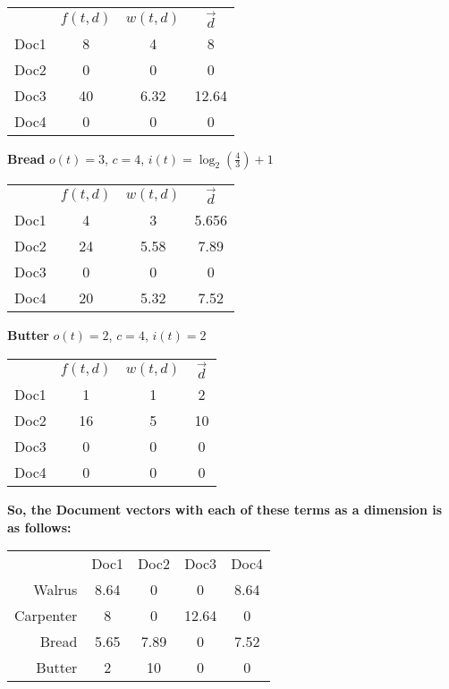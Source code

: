 \documentclass{article}
\begin{document}
\begin{tabular}{r c c c}
\multicolumn{1}{r}{}
 & \multicolumn{1}{c}{$f(t,d)$}
 & \multicolumn{1}{c}{$w(t,d)$}
 & \multicolumn{1}{c}{$\vec{d}$} \\
\cline{2-4}
Doc1 & 8 & 4 & 8 \\
\cline{2-4}
Doc2 & 0 & 0 & 0 \\
\cline{2-4}
Doc3 & 40 & 6.32 & 12.64 \\
\cline{2-4}
Doc4 & 0 & 0 & 0 \\
\cline{2-4}
\end{tabular}

\vspace{5mm}
\textbf{Bread}
$o(t) = 3$, $c = 4$, $i(t) = \log_2(\frac{4}{3}) + 1$

\begin{tabular}{r c c c}
\multicolumn{1}{r}{}
 & \multicolumn{1}{c}{$f(t,d)$}
 & \multicolumn{1}{c}{$w(t,d)$}
 & \multicolumn{1}{c}{$\vec{d}$} \\
\cline{2-4}
Doc1 & 4 & 3 & 5.656 \\
\cline{2-4}
Doc2 & 24 & 5.58 & 7.89 \\
\cline{2-4}
Doc3 & 0 & 0 & 0 \\
\cline{2-4}
Doc4 & 20 & 5.32 & 7.52 \\
\cline{2-4}
\end{tabular}

\vspace{5mm}
\textbf{Butter}
$o(t) = 2$, $c = 4$, $i(t) = 2$


\begin{tabular}{r c c c}
\multicolumn{1}{r}{}
 & \multicolumn{1}{c}{$f(t,d)$}
 & \multicolumn{1}{c}{$w(t,d)$}
 & \multicolumn{1}{c}{$\vec{d}$} \\
\cline{2-4}
Doc1 & 1 & 1 & 2 \\
\cline{2-4}
Doc2 & 16 & 5 & 10 \\
\cline{2-4}
Doc3 & 0 & 0 & 0 \\
\cline{2-4}
Doc4 & 0 & 0 & 0 \\
\cline{2-4}
\end{tabular}

\vspace{5mm}
\textbf{So, the Document vectors with each of these terms as a dimension is as follows:}

\begin{tabular}{r c c c c}
\multicolumn{1}{r}{}
 & \multicolumn{1}{c}{Doc1}
 & \multicolumn{1}{c}{Doc2}
 & \multicolumn{1}{c}{Doc3}
 & \multicolumn{1}{c}{Doc4} \\
\cline{2-5}
Walrus & 8.64 & 0 & 0 & 8.64 \\
\cline{2-5}
Carpenter & 8 & 0 & 12.64 & 0 \\
\cline{2-5}
Bread & 5.65 & 7.89 & 0 & 7.52 \\
\cline{2-5}
Butter & 2 & 10 & 0 & 0 \\
\cline{2-5}
\end{tabular}
\end{document}
